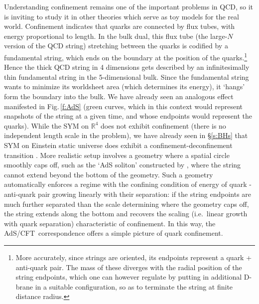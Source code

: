 \documentclass[12pt]{article}
\def\sect#1{\S\ref{#1}}
\def\fig#1{Fig.\,\ref{#1}}
\def\AC{AdS/CFT}
\def\RR{\mathbb{R}}
\begin{document}
Understanding confinement remains one of the important problems in QCD, so it is inviting to study it in other theories which serve as toy models for the real world.
Confinement indicates that quarks are connected by flux tubes, with energy proportional to length.  In the bulk dual, this flux tube (the large-$N$ version of the QCD string) stretching between the quarks is codified by a fundamental string, which ends on the boundary at the position of the quarks.\footnote{
More accurately, since strings are oriented, its endpoints represent a quark + anti-quark pair.  The mass of these diverges with the radial position of the string endpoints, which one can however regulate by putting in additional D-brane in a suitable configuration, so as to terminate the string at finite distance radius.  
}   Hence the thick QCD string in 4 dimensions gets described by an infinitesimally thin fundamental string in the 5-dimensional bulk.  Since the fundamental string wants to minimize its worldsheet area (which determines its energy), it `hangs' form the boundary into the bulk.  We have already seen an analogous effect manifested in \fig{f:AdS} (green curves, which in this context would represent snapshots of the string at a given time, and whose endpoints would represent the quarks). 
While the SYM on $\RR^4$ does not exhibit confinement (there is no independent length scale in the problem), we have already seen in  \sect{s:BHs} 
that SYM on Einstein static universe does exhibit a confinement-deconfinement transition \cite{Witten:1998zw}.
More realistic setup involves a geometry where a spatial circle smoothly caps off, such as the `AdS soliton' constructed by \cite{Horowitz:1998ha}, where the string cannot extend beyond the bottom of the geometry. 
Such a geometry automatically enforces a regime with the confining condition of energy of quark - anti-quark pair growing linearly with their separation:
 if the string endpoints are much further separated than the scale determining where the geometry caps off, the string extends along the bottom and recovers the scaling (i.e.\ linear growth with quark separation) characteristic of confinement. In this way, the  
\AC\ correspondence  offers a simple picture of quark confinement.  
\end{document}
